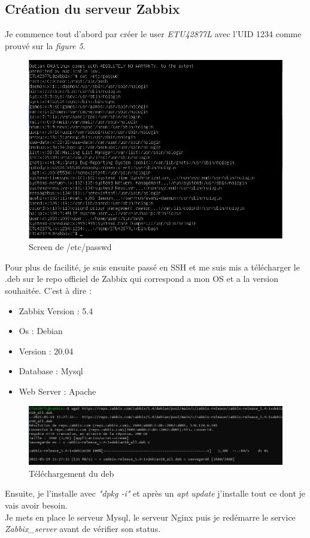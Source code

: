 \documentclass[a4paper]{article}
\begin{document}
\subsection{Création du serveur Zabbix}
Je commence tout d'abord par créer le user \emph{ETU42877L} avec l'UID 1234 comme prouvé sur la \emph{figure 5}.
\begin{figure}[H]
  \centering
  \includegraphics[width=12cm]{images/Rapport/zabbix/passwd.png}
  \caption{Screen de /etc/passwd}
\end{figure}
Pour plus de facilité, je suis ensuite passé en SSH et me suis mis a télécharger le .deb sur le repo officiel de Zabbix qui correspond a mon OS et a la version souhaitée. C'est à dire :
\begin{itemize}
  \item Zabbix Version : 5.4
  \item Os : Debian
  \item Version : 20.04
  \item Database : Mysql
  \item Web Server : Apache
\end{itemize}

\begin{figure}[H]
  \centering
  \includegraphics[width=12cm]{images/Rapport/Zabbix/Dl_repo.png}
  \caption{Téléchargement du deb}
\end{figure}

Ensuite, je l'installe avec \emph{"dpkg -i"} et après un \emph{apt update} j'installe tout ce dont je vais avoir besoin.\\ 
Je mets en place le serveur Mysql, le serveur Nginx puis je redémarre le service \emph{Zabbix\_server} avant de vérifier son status.
\end{document}
